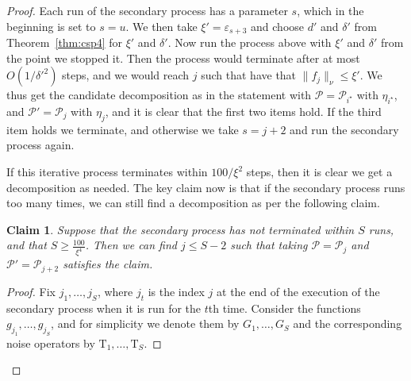 \documentclass[10pt,a4paper]{amsart}
\newtheorem{claim}[thm]{Claim}
\newcommand\norm[1]{\| #1 \|}
\newcommand\eps{\varepsilon}
\renewcommand\geq{\geqslant}
\renewcommand\leq{\leqslant}
\begin{document}
\begin{proof}
    Each run of the secondary process has a parameter $s$, which in the beginning is set to $s=u$. We then take $\xi'=\eps_{s+3}$ and choose $d'$ and $\delta'$ from Theorem~\ref{thm:csp4} for $\xi'$ and $\delta'$. Now run the process above with $\xi'$ and $\delta'$ from the point we stopped it. Then the process would terminate after at most $ O(1/\delta'^2)$ steps, and we would reach $j$ such that have that $\norm{f_j}_{\nu}\leq \xi'$. We thus get the candidate decomposition as in the statement with $\mathcal{P} = \mathcal{P}_{i^{\star}}$ with $\eta_{i^{\star}}$, and  
    $\mathcal{P}' = \mathcal{P}_{j}$ with $\eta_j$, and it is clear that the first two items hold. If the third item holds we terminate, and otherwise we take $s = j+2$ and run the secondary process again.

    If this iterative process terminates within $100/\xi^2$ steps, then it is clear we get a decomposition as needed. The key claim now is that if the secondary process runs too many times, we can still find a decomposition as per the following claim.
    \begin{claim}\label{claim:arithmetic_reg_2nd}
      Suppose that the secondary process has not terminated within $S$ runs, and that $S\geq \frac{100}{\xi^4}$. Then we can find $j\leq S-2$ such that taking $\mathcal{P} = \mathcal{P}_j$ and $\mathcal{P}'=\mathcal{P}_{j+2}$ satisfies the claim.
    \end{claim}
    \begin{proof}
        Fix $j_1,\ldots,j_S$, where $j_t$ is the index $j$ at the end of the execution of the secondary process when it is run for the $t$th time. 
        Consider the functions $ g_{j_1},\ldots,g_{j_S}$, and for simplicity we denote them by $G_1,\ldots,G_{S}$ and the corresponding noise operators by $\mathrm{T}_{1},\ldots,\mathrm{T}_{S}$. 
        

\end{proof}
\end{proof}
\end{document}
